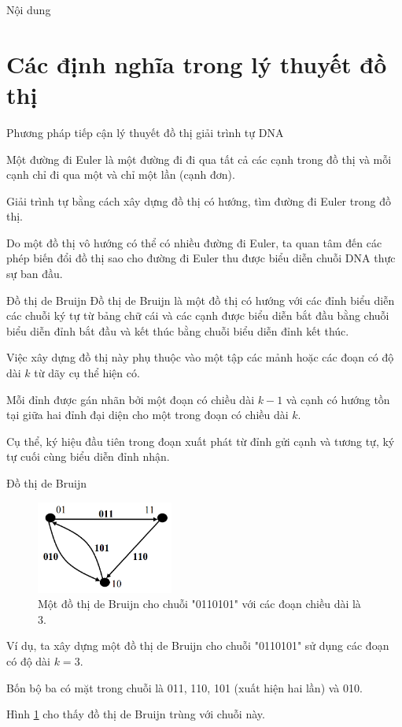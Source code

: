 \documentclass[10pt]{beamer}
\theoremstyle{remark}
\numberwithin{algocf}{section}
\numberwithin{equation}{section}
\numberwithin{dl}{section}
\numberwithin{figure}{section}
\begin{document}
\begin{frame}[plain]{Nội dung}
    \tableofcontents[hidesubsections]
\end{frame}

\section{Các định nghĩa trong lý thuyết đồ thị}

\begin{frame}{Phương pháp tiếp cận lý thuyết đồ thị giải trình tự DNA}

    Một đường đi Euler là một đường đi đi qua tất cả các cạnh trong đồ thị và mỗi cạnh chỉ đi qua một và chỉ một lần (cạnh đơn).

    Giải trình tự bằng cách xây dựng đồ thị có hướng, tìm đường đi Euler trong đồ thị.

    Do một đồ thị vô hướng có thể có nhiều đường đi Euler, ta quan tâm đến các phép biến đổi đồ thị sao cho đường đi Euler thu được biểu diễn chuỗi DNA thực sự ban đầu.

    
\end{frame}

\begin{frame}{Đồ thị de Bruijn}
    Đồ thị de Bruijn là một đồ thị có hướng với các đỉnh biểu diễn các chuỗi ký tự từ bảng chữ cái và các cạnh được biểu diễn bắt đầu bằng chuỗi biểu diễn đỉnh bắt đầu và kết thúc bằng chuỗi biểu diễn đỉnh kết thúc.

    Việc xây dựng đồ thị này phụ thuộc vào một tập các mảnh hoặc các đoạn có độ dài $k$ từ dãy cụ thể hiện có.

    Mỗi đỉnh được gán nhãn bởi một đoạn có chiều dài $k-1$ và cạnh có hướng tồn tại giữa hai đỉnh đại diện cho một trong đoạn có chiều dài $k$.

    Cụ thể, ký hiệu đầu tiên trong đoạn xuất phát từ đỉnh gửi cạnh và tương tự, ký tự cuối cùng biểu diễn đỉnh nhận.

\end{frame}

\begin{frame}{Đồ thị de Bruijn}
    \begin{figure}[h!]
        \centering
        \includegraphics[width=0.4\textwidth]{1.png}
        \caption{Một đồ thị de Bruijn cho chuỗi "0110101" với các đoạn chiều dài là 3.}
        \label{fig:1}
    \end{figure}

    Ví dụ, ta xây dựng một đồ thị de Bruijn cho chuỗi "0110101" sử dụng các đoạn có độ dài $k=3$.

    Bốn bộ ba có mặt trong chuỗi là 011, 110, 101 (xuất hiện hai lần) và 010.
    
    Hình \ref{fig:1} cho thấy đồ thị de Bruijn trùng với chuỗi này.
\end{frame}
\end{document}
